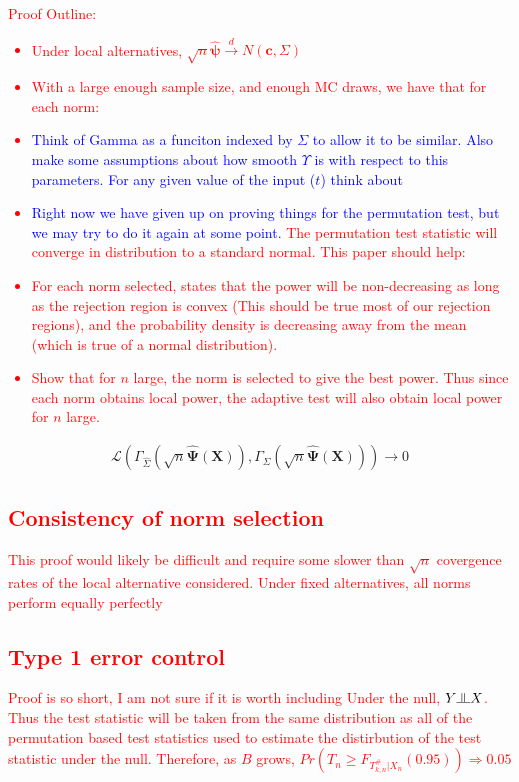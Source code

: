 \documentclass{article}
\newcommand{\sh}{\textcolor{red}}
\newcommand{\vmat}{\Sigma}
\newcommand{\indep}{\raisebox{0.05em}{\rotatebox[origin=c]{90}{$\models$}}}
\newcommand{\rvo}{X}
\newcommand{\gi}{\Upsilon}
\begin{document}
\sh{Proof Outline: \\
\begin{itemize}
	\item Under local alternatives, $\sqrt{n}\hat{\boldsymbol{\psi}} \xrightarrow{d} N(\boldsymbol{c}, \Sigma)$
	\item With a large enough sample size, and enough MC draws, we have that for each norm: 
    \item \textcolor{blue}{Think of Gamma as a funciton indexed by $\Sigma$ to allow it to be similar.  Also make some assumptions about how smooth $\gi$ is with respect to this parameters. For any given value of the input ($t$) think about }
	\item \textcolor{blue}{Right now we have given up on proving things for the permutation test, but we may try to do it again at some point.} The permutation test statistic will converge in distribution to a standard normal.  This paper should help: \citep{omelka_testing_2012}
	\item For each norm selected, \citep{gupta_inequalitites_1972} states that the power will be non-decreasing as long as the rejection region is convex (This should be true most of our rejection regions), and the probability density is decreasing away from the mean (which is true of a normal distribution).  
	\item Show that for $n$ large, the norm is selected to give the best power.  Thus since each norm obtains local power, the adaptive test will also obtain local power for $n$ large.
\end{itemize}} 
\begin{align*}
	\mathcal{L}\left(\Gamma_{\hat{\vmat}}\left(\sqrt{n} \hat{\boldsymbol{\Psi}}(\boldsymbol{X})\right), \Gamma_{\vmat}\left(\sqrt{n} \hat{\boldsymbol{\Psi}}(\boldsymbol{X})\right)\right) \rightarrow 0
\end{align*}

\sh{\subsection{Consistency of norm selection} 
This proof would likely be difficult and require some slower than $\sqrt{n}$ covergence rates of the local alternative considered.  Under fixed alternatives, all norms perform equally perfectly}

\sh{\subsection{Type 1 error control}
Proof is so short, I am not sure if it is worth including
Under the null, $Y \indep \rvo$.  Thus the test statistic will be taken from the same distribution as all of the permutation based test statistics used to estimate the distirbution of the test statistic under the null.  Therefore, as $B$ grows, $Pr(T_n \geq F_{T^\#_{k,n}|\rvo_n}(0.95)) \Rightarrow 0.05$
}
\end{document}
